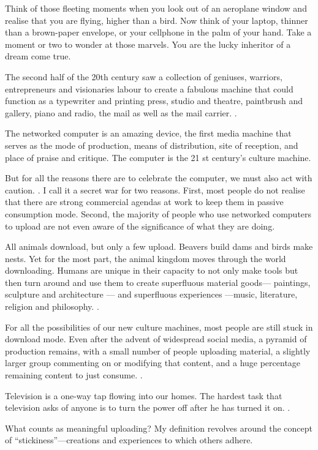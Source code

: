 \TiGanSpace

Think of those fleeting moments when you look out of an aeroplane window
and realise that you are flying, higher than a bird. Now think of your
laptop, thinner than a brown-paper envelope, or your cellphone in the
palm of your hand. Take a moment or two to wonder at those marvels. You
are the lucky inheritor of a dream come true.

The second half of the 20th century saw a collection of geniuses,
warriors, entrepreneurs and visionaries labour to create a fabulous
machine that could function as a typewriter and printing press, studio
and theatre, paintbrush and gallery, piano and radio, the mail as well
as the mail carrier. \linefill.

The networked computer is an amazing device, the first media machine
that serves as the mode of production, means of distribution, site of
reception, and place of praise and critique. The computer is the 21 st
century's culture machine.

But for all the reasons there are to celebrate the computer, we must
also act with caution. \linefill. I call it a secret
war for two reasons. First, most people do not realise that there are
strong commercial agendas at work to keep them in passive consumption
mode. Second, the majority of people who use networked computers to
upload are not even aware of the significance of what they are doing.

All animals download, but only a few upload. Beavers build dams and
birds make nests. Yet for the most part, the animal kingdom moves
through the world downloading. Humans are unique in their capacity to
not only make tools but then turn around and use them to create
superfluous material goods--- paintings, sculpture and
architecture --- and superfluous experiences ---music, literature,
religion and philosophy. \linefill.

For all the possibilities of our new culture machines, most people are
still stuck in download mode. Even after the advent of widespread social
media, a pyramid of production remains, with a small number of people
uploading material, a slightly larger group commenting on or modifying
that content, and a huge percentage remaining content to just consume.
\linefill.

Television is a one-way tap flowing into our homes. The hardest task
that television asks of anyone is to turn the power off after he has
turned it on. \linefill.

What counts as meaningful uploading? My definition revolves around the
concept of  ``stickiness''---creations and experiences to which others
adhere.


